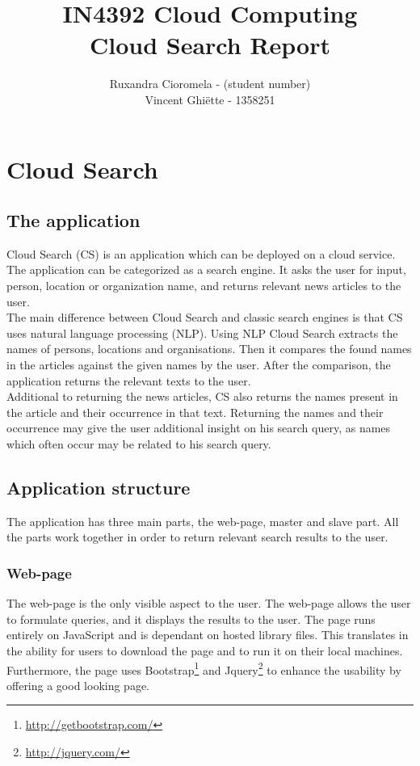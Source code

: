 \documentclass[11pt]{article} %
\title{IN4392 Cloud Computing\\Cloud Search Report}
\author{Ruxandra Cioromela - (student number)\\Vincent Ghi\"ette - 1358251 }
\begin{document}
\maketitle

\section{Cloud Search}
\subsection{The application}
Cloud Search (CS) is an application which can be deployed on a cloud service.
The application can be categorized as a search engine.
It asks the user for input, person, location or organization name, and returns relevant news articles to the user.\\
The main difference between Cloud Search and classic search engines is that CS uses natural language processing (NLP).
Using NLP Cloud Search extracts the names of persons, locations and organisations.
Then it compares the found names in the articles against the given names by the user.
After the comparison, the application returns the relevant texts to the user.\\
Additional to returning the news articles, CS also returns the names present in the article and their occurrence in that text.
Returning the names and their occurrence may give the user additional insight on his search query, as names which often occur may be related to his search query.

\subsection{Application structure}
The application has three main parts, the web-page, master and slave part. 
All the parts work together in order to return relevant search results to the user.

\subsubsection{Web-page}
The web-page is the only visible aspect to the user.
The web-page allows the user to formulate queries, and it displays the results to the user.
The page runs entirely on JavaScript and is dependant on hosted library files.
This translates in the ability for users to download the page and to run it on their local machines.\\
Furthermore, the page uses Bootstrap\footnote{\url{http://getbootstrap.com/}} and Jquery\footnote{\url{http://jquery.com/}} to enhance the usability by offering a good looking page.
\end{document}
